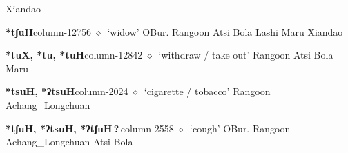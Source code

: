          Xiandao 
  \item {\footnotesize \textbf{*tʃuH}}{\tiny column-12756}
         $\diamond$~`widow'
         OBur. 
\hspace{1ex}
         Rangoon 
\hspace{1ex}
         Atsi 
\hspace{1ex}
         Bola 
\hspace{1ex}
         Lashi 
\hspace{1ex}
         Maru 
\hspace{1ex}
         Xiandao 
  \item {\footnotesize \textbf{*tuX, *tu, *tuH}}{\tiny column-12842}
         $\diamond$~`withdraw / take out'
         Rangoon 
\hspace{1ex}
         Atsi 
\hspace{1ex}
         Bola 
\hspace{1ex}
         Maru 
  \item {\footnotesize \textbf{*tsuH, *ʔtsuH}}{\tiny column-2024}
         $\diamond$~`cigarette / tobacco'
         Rangoon 
\hspace{1ex}
         Achang\_Longchuan 
  \item {\footnotesize \textbf{*tʃuH, *ʔtsuH, *ʔtʃuH\,?\,}}{\tiny column-2558}
         $\diamond$~`cough'
         OBur. 
\hspace{1ex}
         Rangoon 
\hspace{1ex}
         Achang\_Longchuan 
\hspace{1ex}
         Atsi 
\hspace{1ex}
         Bola 
